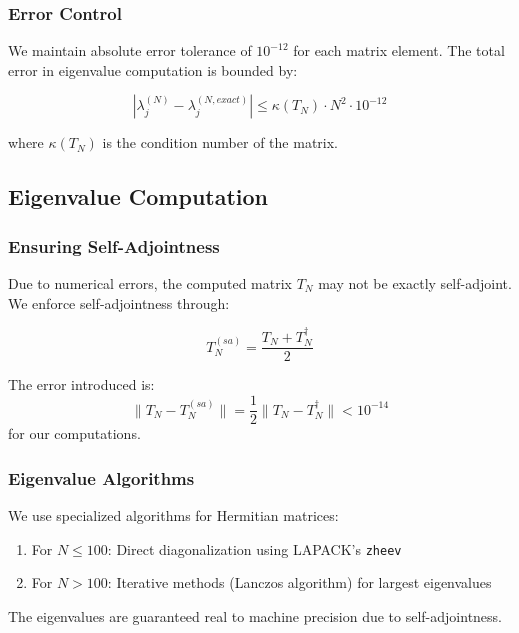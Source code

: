 \documentclass[12pt,letterpaper]{article}
\theoremstyle{plain}
\theoremstyle{definition}
\theoremstyle{remark}
\newcommand{\norm}[1]{\|#1\|}
\begin{document}
\subsubsection{Error Control}

We maintain absolute error tolerance of $10^{-12}$ for each matrix element. The total error in eigenvalue computation is bounded by:

\begin{equation}
|\lambda_j^{(N)} - \lambda_j^{(N,exact)}| \leq \kappa(T_N) \cdot N^2 \cdot 10^{-12}
\end{equation}

where $\kappa(T_N)$ is the condition number of the matrix.

\subsection{Eigenvalue Computation}

\subsubsection{Ensuring Self-Adjointness}

Due to numerical errors, the computed matrix $T_N$ may not be exactly self-adjoint. We enforce self-adjointness through:

\begin{equation}
T_N^{(sa)} = \frac{T_N + T_N^{\dagger}}{2}
\end{equation}

The error introduced is:
\begin{equation}
\norm{T_N - T_N^{(sa)}} = \frac{1}{2}\norm{T_N - T_N^{\dagger}} < 10^{-14}
\end{equation}
for our computations.

\subsubsection{Eigenvalue Algorithms}

We use specialized algorithms for Hermitian matrices:
\begin{enumerate}
\item For $N \leq 100$: Direct diagonalization using LAPACK's \texttt{zheev}
\item For $N > 100$: Iterative methods (Lanczos algorithm) for largest eigenvalues
\end{enumerate}

The eigenvalues are guaranteed real to machine precision due to self-adjointness.
\end{document}
